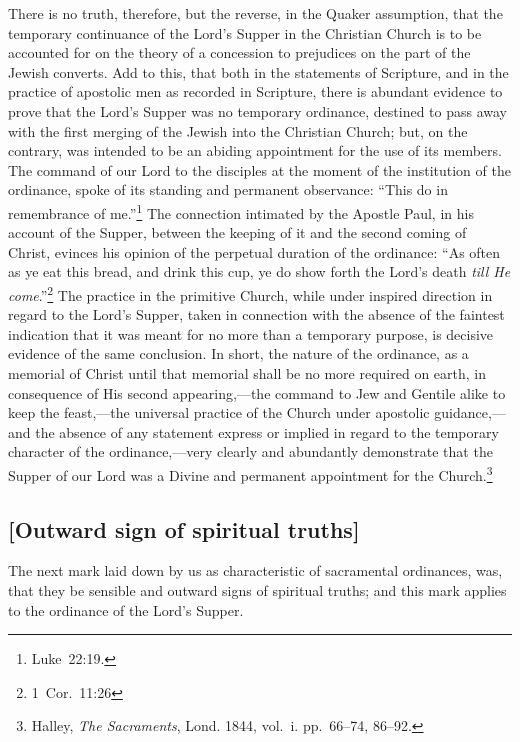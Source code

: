 \documentclass[
]{book}
\begin{document}
There is no truth, therefore, but the reverse, in the Quaker assumption, that the temporary continuance of the Lord's Supper in the Christian Church is to be accounted for on the theory of a concession to prejudices on the part of the Jewish converts. Add to this, that both in the statements of Scripture, and in the practice of apostolic men as recorded in Scripture, there is abundant evidence to prove that the Lord's Supper was no temporary ordinance, destined to pass away with the first merging of the Jewish into the Christian Church; but, on the contrary, was intended to be an abiding appointment for the use of its members. The command of our Lord to the disciples at the moment of the institution of the ordinance, spoke of its standing and permanent observance: ``This do in remembrance of me.''\footnote{Luke~22:19.} The connection intimated by the Apostle Paul, in his account of the Supper, between the keeping of it and the second coming of Christ, evinces his opinion of the perpetual duration of the ordinance: ``As often as ye eat this bread, and drink this cup, ye do show forth the Lord's death \emph{till He come}.''\footnote{1~Cor.~11:26} The practice in the primitive Church, while under inspired direction in regard to the Lord's Supper, taken in connection with the absence of the faintest indication that it was meant for no more than a temporary purpose, is decisive evidence of the same conclusion. In short, the nature of the ordinance, as a memorial of Christ until that memorial shall be no more required on earth, in consequence of His second appearing,---the command to Jew and Gentile alike to keep the feast,---the universal practice of the Church under apostolic guidance,---and the absence of any statement express or implied in regard to the temporary character of the ordinance,---very clearly and abundantly demonstrate that the Supper of our Lord was a Divine and permanent appointment for the Church.\footnote{Halley, \emph{The Sacraments}, Lond. 1844, vol.~i. pp.~66--74, 86--92.}

\hypertarget{outward-sign-of-spiritual-truths}{%
\subsection{{[}Outward sign of spiritual truths{]}}\label{outward-sign-of-spiritual-truths}}

The next mark laid down by us as characteristic of sacramental ordinances, was, that they be sensible and outward signs of spiritual truths; and this mark applies to the ordinance of the Lord's Supper.
\end{document}
